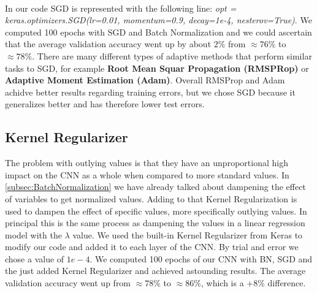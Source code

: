 \documentclass{article}
\begin{document}
	\\
	In our code SGD is represented with the following line: \textit{opt = keras.optimizers.SGD(lr=0.01, momentum=0.9, decay=1e-4, nesterov=True)}. We computed 100 epochs with SGD and Batch Normalization and we could ascertain that the average validation accuracy went up by about $2\%$ from $\approx76\%$ to $\approx78\%$. There are many different types of adaptive methods that perform similar tasks to SGD, for example \textbf{Root Mean Squar Propagation (RMSPRop)} or \textbf{Adaptive Moment Estimation (Adam)}. Overall RMSProp and Adam achidve better results regarding training errors, but we chose SGD because it generalizes better and has therefore lower test errors. 
	
	
	
	
	
	
	
	
	
	

	\subsection{Kernel Regularizer}
	\label{subsec:KernelRegularizer}
	The problem with outlying values is that they have an unproportional high impact on the CNN as a whole when compared to more standard values. In \autoref{subsec:BatchNormalization} we have already talked about dampening the effect of variables to get normalized values. Adding to that Kernel Regularization is used to dampen the effect of specific values, more specifically outlying values. In principal this is the same process as dampening the values in a linear regression model with the $\lambda$ value. We used the built-in Kernel Regularizer from Keras to modify our code and added it to each layer of the CNN. By trial and error we chose a value of $1e-4$. We computed 100 epochs of our CNN with BN, SGD and the just added Kernel Regularizer and achieved astounding results. The average validation accuracy went up from $\approx78\%$ to $\approx86\%$, which is a $+8\%$ difference. 
	
\end{document}
